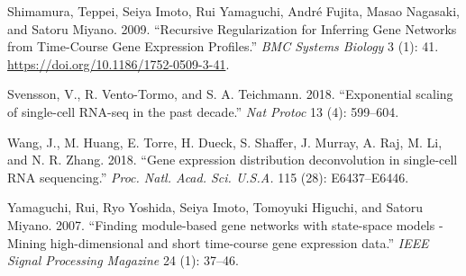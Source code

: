 \documentclass[]{article}
\begin{document}
\leavevmode\hypertarget{ref-Shimamura2009}{}%
Shimamura, Teppei, Seiya Imoto, Rui Yamaguchi, André Fujita, Masao
Nagasaki, and Satoru Miyano. 2009. ``Recursive Regularization for
Inferring Gene Networks from Time-Course Gene Expression Profiles.''
\emph{BMC Systems Biology} 3 (1): 41.
\url{https://doi.org/10.1186/1752-0509-3-41}.

\leavevmode\hypertarget{ref-Svensson2018}{}%
Svensson, V., R. Vento-Tormo, and S. A. Teichmann. 2018. ``Exponential
scaling of single-cell RNA-seq in the past decade.'' \emph{Nat Protoc}
13 (4): 599--604.

\leavevmode\hypertarget{ref-Wang2018}{}%
Wang, J., M. Huang, E. Torre, H. Dueck, S. Shaffer, J. Murray, A. Raj,
M. Li, and N. R. Zhang. 2018. ``Gene expression distribution
deconvolution in single-cell RNA sequencing.'' \emph{Proc. Natl. Acad.
Sci. U.S.A.} 115 (28): E6437--E6446.

\leavevmode\hypertarget{ref-Yamaguchi2007}{}%
Yamaguchi, Rui, Ryo Yoshida, Seiya Imoto, Tomoyuki Higuchi, and Satoru
Miyano. 2007. ``Finding module-based gene networks with state-space
models - Mining high-dimensional and short time-course gene expression
data.'' \emph{IEEE Signal Processing Magazine} 24 (1): 37--46.
\end{document}
